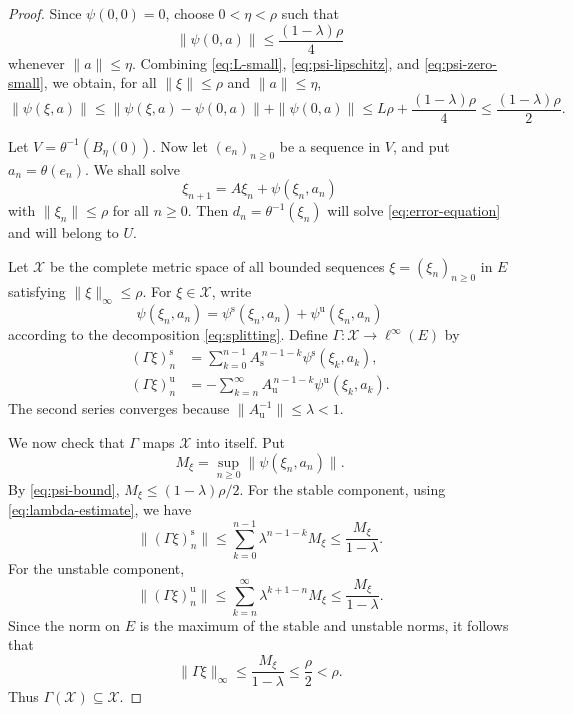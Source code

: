 \documentclass[10pt,a4paper]{amsart}
\begin{document}
\begin{proof}
Since $\psi(0,0)=0$, choose $0<\eta<\rho$ such that
\begin{equation}\label{eq:psi-zero-small}
\|\psi(0,a)\|\leq \frac{(1-\lambda)\rho}{4}
\end{equation}
whenever $\|a\|\leq\eta$. Combining \eqref{eq:L-small},
\eqref{eq:psi-lipschitz},  and
\eqref{eq:psi-zero-small}, we obtain, for all $\|\xi\|\leq\rho$ and
$\|a\|\leq\eta$,
\begin{equation}\label{eq:psi-bound}
\|\psi(\xi,a)\|
\leq
\|\psi(\xi,a)-\psi(0,a)\|+\|\psi(0,a)\|
\leq
L\rho+\frac{(1-\lambda)\rho}{4}
\leq
\frac{(1-\lambda)\rho}{2}.
\end{equation}

Let $V=\theta^{-1}(B_\eta(0))$. Now let $(e_n)_{n\geq 0}$ be a sequence
in $V$, and put $a_n=\theta(e_n)$. We shall solve
\begin{equation}\label{eq:coordinate-recurrence}
\xi_{n+1}=A\xi_n+\psi(\xi_n,a_n)
\end{equation}
with $\|\xi_n\|\leq\rho$ for all $n\geq 0$. Then
$d_n=\theta^{-1}(\xi_n)$ will solve \eqref{eq:error-equation} and will
belong to $U$.

Let $\mathcal X$ be the complete metric space of all bounded sequences
$\xi=(\xi_n)_{n\geq 0}$ in $E$ satisfying $\|\xi\|_\infty\leq\rho$. For
$\xi\in\mathcal X$, write
\[
\psi(\xi_n,a_n)
=
\psi^{\mathrm{s}}(\xi_n,a_n)+\psi^{\mathrm{u}}(\xi_n,a_n)
\]
according to the decomposition \eqref{eq:splitting}. Define
$\Gamma:\mathcal X\to \ell^\infty(E)$ by
\begin{align}
(\Gamma\xi)_n^{\mathrm{s}}
&=
\sum_{k=0}^{n-1}A_{\mathrm{s}}^{\,n-1-k}
\psi^{\mathrm{s}}(\xi_k,a_k),
\label{eq:Gamma-stable}\\
(\Gamma\xi)_n^{\mathrm{u}}
&=
-\sum_{k=n}^{\infty}A_{\mathrm{u}}^{\,n-1-k}
\psi^{\mathrm{u}}(\xi_k,a_k).
\label{eq:Gamma-unstable}
\end{align}
The second series converges because
$\|A_{\mathrm{u}}^{-1}\|\leq\lambda<1$.

We now check that $\Gamma$ maps $\mathcal X$ into itself. Put
\[
M_\xi=\sup_{n\geq 0}\|\psi(\xi_n,a_n)\|.
\]
By \eqref{eq:psi-bound}, $M_\xi\leq (1-\lambda)\rho/2$. For the stable
component, using \eqref{eq:lambda-estimate}, we have
\[
\|(\Gamma\xi)_n^{\mathrm{s}}\|
\leq
\sum_{k=0}^{n-1}\lambda^{n-1-k}M_\xi
\leq
\frac{M_\xi}{1-\lambda}.
\]
For the unstable component,
\[
\|(\Gamma\xi)_n^{\mathrm{u}}\|
\leq
\sum_{k=n}^{\infty}\lambda^{k+1-n}M_\xi
\leq
\frac{M_\xi}{1-\lambda}.
\]
Since the norm on $E$ is the maximum of the stable and unstable norms, it
follows that
\[
\|\Gamma\xi\|_\infty
\leq
\frac{M_\xi}{1-\lambda}
\leq
\frac{\rho}{2}
<\rho.
\]
Thus $\Gamma(\mathcal X)\subseteq\mathcal X$.


\end{proof}
\end{document}
